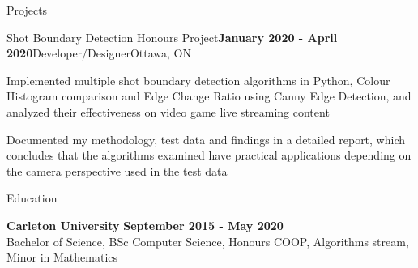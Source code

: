 \documentclass{resume} %
\begin{document}
\begin{rSection}{Projects}


\begin{rSubsection}{Shot Boundary Detection Honours Project}{\textbf{January 2020 - April 2020}}{Developer/Designer}{Ottawa, ON}{}
\item Implemented multiple shot boundary detection algorithms in Python, Colour Histogram comparison and Edge Change Ratio using Canny Edge Detection, and analyzed their effectiveness on video game live streaming content
\item Documented my methodology, test data and findings in a detailed report, which concludes that the algorithms examined have practical applications depending on the camera perspective used in the test data
\end{rSubsection}


\end{rSection}

\begin{rSection}{Education}

{\bf Carleton University} \hfill {\textbf{September 2015 - May 2020}} \\ 
Bachelor of Science, BSc Computer Science, Honours COOP, Algorithms stream, Minor in Mathematics  \\

\end{rSection}
\end{document}
